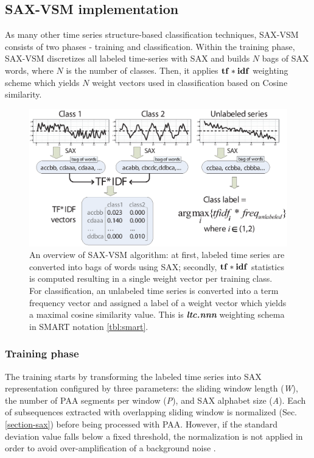 \subsection{SAX-VSM implementation} \label{sax-vsm}
As many other time series structure-based classification techniques, SAX-VSM consists of two 
phases - training and classification. Within the training phase, SAX-VSM discretizes all labeled time-series
with SAX and builds $N$ bags of SAX words, where $N$ is the number of classes. 
Then, it applies $\text{\textbf{tf}}\ast\text{\textbf{idf}}$ weighting scheme which yields $N$ 
weight vectors used in classification based on Cosine similarity.


\begin{figure}[t]
   \centering
   \includegraphics[width=148mm]{figures/overview.eps}
   \caption{
   An overview of SAX-VSM algorithm: 
   at first, labeled time series are converted into bags of words using SAX; 
   secondly, $\text{\textbf{tf}}\ast\text{\textbf{idf}}$ statistics is computed resulting in 
   a single weight vector per training class. For classification, an unlabeled 
   time series is converted into a term frequency vector and assigned a 
   label of a weight vector which yields a maximal cosine similarity value.
   This is \textit{\textbf{ltc.nnn}} weighting schema in SMART notation \ref{tbl:smart}.}
   \label{fig:sax-vsm_overview}
\end{figure}

\subsubsection{Training phase}
The training starts by transforming the labeled time series into SAX representation
configured by three parameters: the sliding window length (\textit{W}), 
the number of PAA segments per window (\textit{P}), 
and SAX alphabet size (\textit{A}).
Each of subsequences extracted with overlapping sliding window 
is normalized (Sec. \ref{section-sax}) before being processed with PAA. 
However, if the standard deviation value falls below a fixed threshold, the 
normalization is not applied in order to avoid over-amplification 
of a background noise \cite{sax}. 

